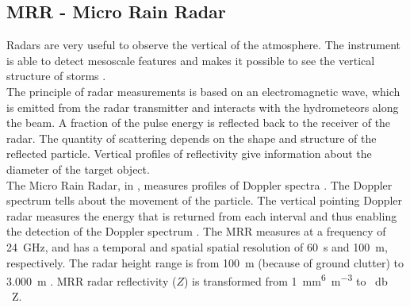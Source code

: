 
%

\subsection{MRR - Micro Rain Radar}\label{sec:MRR}

Radars are very useful to observe the vertical of the atmosphere. The instrument is able to detect mesoscale features and makes it possible to see the vertical structure of storms \citep{markowski_mesoscale_2011}.\\
The principle of radar measurements is based on an electromagnetic wave, which is emitted from the radar transmitter and interacts with the hydrometeors along the beam. A fraction of the pulse energy is reflected back to the receiver of the radar. The quantity of scattering depends on the shape and structure of the reflected particle. 
Vertical profiles of reflectivity give information about the diameter of the target object.
\\
The Micro Rain Radar, in , measures profiles of Doppler spectra \citep{metek_micro_2010}. The Doppler spectrum tells about the movement of the particle. The vertical pointing Doppler radar measures the energy that is returned from each interval and thus enabling the detection of the Doppler spectrum \citep{lecuyer_aos_2017}. The MRR measures at a frequency of \SI{24}{\giga\Hz}, and has a temporal and spatial spatial resolution of \SI{60}{\second} and \SI{100}{\metre}, respectively. The radar height range is from \SI{100}{\metre} (because of ground clutter) to \SI{3.000}{\metre} \citep{metek_micro_2010}.
% 
\noindent 
MRR radar reflectivity ($Z$) is transformed from \SI{1}{\mm^6\per\metre^3} to \SI{}{\decibel\,Z}.
